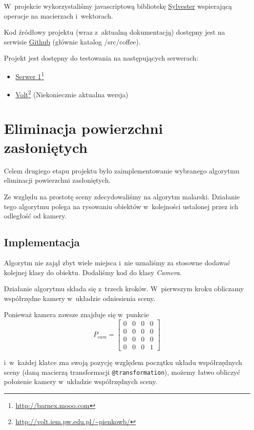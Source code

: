 \documentclass[a4paper]{article}
\begin{document}
{W~projekcie wykorzystaliśmy javascriptową bibliotekę \href{http://sylvester.jcoglan.com/}{Sylvester} wspierającą operacje na macierzach i~wektorach.

Kod źródłowy projektu (wraz z~aktualną dokumentacją) dostępny jest na serwisie \href{https://github.com/barnaba/coffeecam}{Github} (głównie katalog /src/coffee).

Projekt jest dostępny do testowania na następujących serwerach:
\begin{itemize}
  \item \href{http://barnex.mooo.com/}{Serwer 1}\footnote{\url{http://barnex.mooo.com}}
  \item \href{http://volt.iem.pw.edu.pl/~pienkowb/}{Volt}\footnote{\url{http://volt.iem.pw.edu.pl/~pienkowb/}} (Niekoniecznie aktualna wersja)
\end{itemize}

\section{Eliminacja powierzchni zasłoniętych}
Celem drugiego etapu projektu było zaimplementowanie wybranego algorytmu eliminacji powierzchni zasłoniętych.

Ze względu na prostotę sceny zdecydowaliśmy na algorytm malarski.
Działanie tego algorytmu polega na rysowaniu obiektów w~kolejności ustalonej przez ich odległość od kamery.

\subsection{Implementacja}
Algorytm nie zajął zbyt wiele miejsca i~nie uznaliśmy za stosowne dodawać kolejnej klasy do obiektu.
Dodaliśmy kod do klasy \emph{Camera}.

Działanie algorytmu składa się z~trzech kroków.
W~pierwszym kroku obliczamy współrzędne kamery w~układzie odniesienia sceny.

Ponieważ kamera zawsze znajduje się w~punkcie
\[
P_{cam} = 
\begin{bmatrix}
  0 & 0 & 0 & 0 \\
  0 & 0 & 0 & 0 \\
  0 & 0 & 0 & 0 \\
  0 & 0 & 0 & 1
\end{bmatrix}
\]

i~w~każdej klatce zna swoją pozycję względem początku układu współrzędnych sceny (daną macierzą transformacji \texttt{@transformation}), możemy łatwo obliczyć położenie kamery w~układzie współrzędnych sceny.

}
\end{document}
